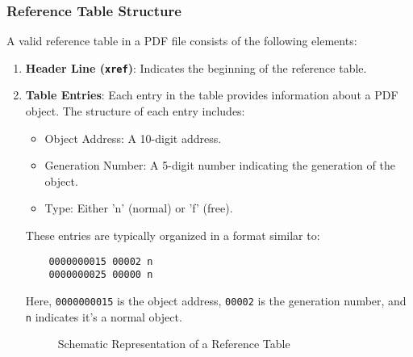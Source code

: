 \documentclass{article}
\begin{document}
\subsubsection*{Reference Table Structure}

A valid reference table in a PDF file consists of the following elements:

\begin{enumerate}
    \item \textbf{Header Line (\texttt{xref})}: Indicates the beginning of the reference table.
    
    \item \textbf{Table Entries}: Each entry in the table provides information about a PDF object. The structure of each entry includes:
    \begin{itemize}
        \item Object Address: A 10-digit address.
        \item Generation Number: A 5-digit number indicating the generation of the object.
        \item Type: Either 'n' (normal) or 'f' (free).
    \end{itemize}
    
    These entries are typically organized in a format similar to:
    \begin{verbatim}
    0000000015 00002 n
    0000000025 00000 n
    \end{verbatim}
    
    Here, \texttt{0000000015} is the object address, \texttt{00002} is the generation number, and \texttt{n} indicates it's a normal object.
    
    \begin{figure}[H]
        \centering
        \caption{Schematic Representation of a Reference Table}
        \label{fig:reference_table}
    \end{figure}
    
\end{enumerate}
\end{document}
